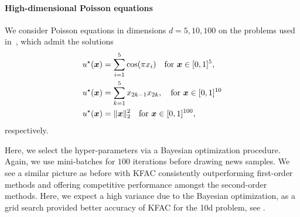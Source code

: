 \paragraph{High-dimensional Poisson equations}
We consider Poisson equations in dimensions $d=5,10,100$ on the problems used in~\cite{yu2018deep, muller2023achieving}, which admit the solutions
\begin{align}\label{eq:solutions_poisson}
  \begin{split}
    u^\star({\bm{x}}) & = \sum_{i=1}^5 \cos(\pi x_i) \quad \text{for } {\bm{x}}\in [0,1]^{5}, \\
    u^\star({\bm{x}}) & = \sum_{k=1}^5 x_{2k-1}x_{2k},  \quad \text{for } {\bm{x}}\in [0,1]^{10} \\
    u^\star({\bm{x}}) & = \lVert {\bm{x}} \rVert_2^2 \quad \text{for } {\bm{x}}\in [0,1]^{100},
  \end{split}
\end{align}
respectively.

Here, we select the hyper-parameters via a Bayesian optimization procedure.
Again, we use mini-batches for $100$ iterations before drawing news samples.
We see a similar picture as before with KFAC consistently outperforming first-order methods and offering competitive performance amongst the second-order methods.
Here, we expect a high variance due to the Bayesian optimization, as a grid search provided better accuracy of KFAC for the 10d problem, see .


